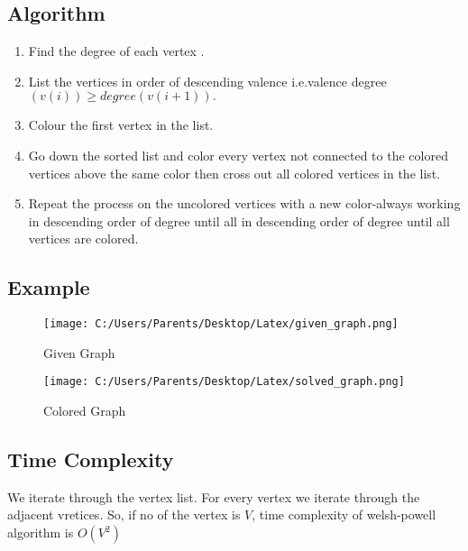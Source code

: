 \documentclass[a4paper,12pt]{article}
\newcommand*{\mybox}[2]{\colorbox{#1!30}{\parbox{.98\linewidth}{#2}}}
\begin{document}
\subsection{Algorithm}

\mybox{gray}{
\begin{enumerate}
\item Find the degree of each vertex . 
\item List the vertices in order of descending valence i.e.valence degree $(v(i)) \geq degree (v(i+1)).$
\item Colour the first vertex in the list. 
\item Go down the sorted list and color every vertex not connected to the colored  vertices above the same color then cross  out all colored vertices in the list.
\item Repeat the process on the uncolored vertices with a new color-always working in descending order of degree until all in descending order of degree until all vertices are colored.
\end{enumerate}
}
\par
\subsection{Example}
\begin{figure}[H]
 	\centering
 	\texttt{[image: C:/Users/Parents/Desktop/Latex/given\_graph.png]}
 	\caption[optional caption]{Given Graph}
 	\label{fig:given_graph}
 \end{figure}
 
 \begin{figure}[H]
 	\centering
 	\texttt{[image: C:/Users/Parents/Desktop/Latex/solved\_graph.png]}
 	\caption[optional caption]{Colored Graph}
 	\label{fig:colored_graph}
 \end{figure}
 
 \subsection{Time Complexity}
 We iterate through the vertex list. For every vertex we iterate through the adjacent vretices. So, if no of the vertex is $V$, time complexity of welsh-powell algorithm is $O(V^2)$
\end{document}
